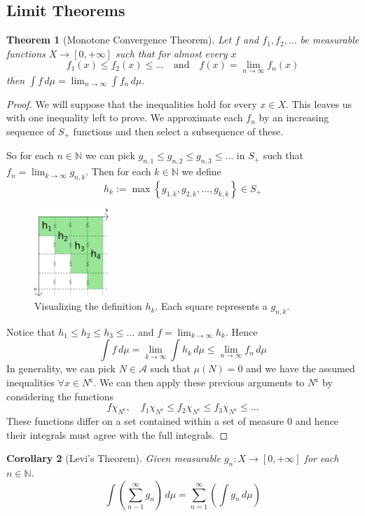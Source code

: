\documentclass[11pt]{article}
\newcommand{\defeq}{:=}
\newcommand{\dm}{\ensuremath{\,d\mu}}
\newcommand{\stcmp}{^{\mathsf{c}}}
\newcommand{\N}{\mathbb{N}}
\newtheorem{theorem}{Theorem}[section]
\newtheorem{cor}[theorem]{Corollary}
\begin{document}
\subsection{Limit Theorems}
\begin{theorem}[Monotone Convergence Theorem]
Let $f$ and $f_1, f_2, \dots$ be measurable functions $X\to[0, +\infty]$ such that for almost every $x$
\[
	f_1(x)\leq f_2(x)\leq \dots \quad \text{and} \quad f(x)=\lim_{n\to\infty}f_n(x)
\]
then $\int f\dm = \lim_{n\to\infty}\int f_n \dm$.
\end{theorem}
\begin{proof}
We will suppose that the inequalities hold for every $x\in X$.
This leaves us with one inequality left to prove.
We approximate each $f_n$ by an increasing sequence of $S_+$ functions and then select a subsequence of these.

So for each $n\in\N$ we can pick $g_{n,1}\leq g_{n,2} \leq g_{n,3} \leq \dots$ in $S_+$ such that $f_n=\lim_{k\to\infty}g_{n,k}$.
Then for each $k\in\N$ we define
\[
	h_k\defeq\max\left\{g_{1,k},g_{2,k}, \dots , g_{k,k}\right\}\in S_+
\]
\begin{figure}[H]
	\centering
	\includegraphics[width=0.25\textwidth]{mct_diagram.png}	
	\caption{Visualizing the definition $h_k$. Each square represents a $g_{n,k}$.}
\end{figure}
Notice that $h_1\leq h_2 \leq h_3 \leq \dots$ and $f=\lim_{k\to\infty}h_k$.
Hence
\[
	\int f \dm = \lim_{k\to\infty}\int h_k \dm \leq \lim_{n\to\infty}f_n \dm
\]
In generality, we can pick $N\in\mathcal{A}$ such that $\mu(N)=0$ and we have the assumed inequalities $\forall x\in N\stcmp$.
We can then apply these previous arguments to $N\stcmp$ by considering the functions
\[
	f\chi_{N\stcmp}, \quad f_1\chi_{N\stcmp} \leq f_2\chi_{N\stcmp} \leq f_3\chi_{N\stcmp} \leq \dots
\]
These functions differ on a set contained within a set of measure 0 and hence their integrals must agree with the full integrals.
\end{proof}
\begin{cor}[Levi's Theorem]
	Given measurable $g_n: X\to[0, +\infty]$ for each $n\in\N$.
	\[
		\int\left( \sum_{n-1}^{\infty}g_n \right)\dm = \sum_{n=1}^{\infty}\left(\int g_n \dm\right)
	\]	
\end{cor}
\end{document}
